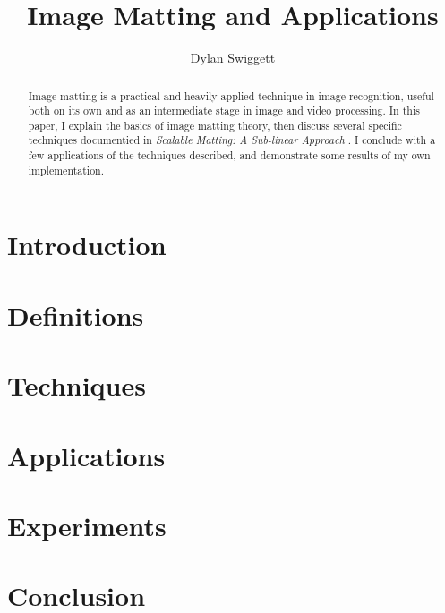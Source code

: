 \documentclass[10pt,a4paper]{article}
\author{Dylan Swiggett}
\title{Image Matting and Applications}
\date{}
\begin{document}
\maketitle

\begin{abstract}
Image matting is a practical and heavily applied technique in image recognition, useful both on its own and as an intermediate stage in image and video processing. In this paper, I explain the basics of image matting theory, then discuss several specific techniques documentied in \textit{Scalable Matting: A Sub-linear Approach} \cite{lee14}. I conclude with a few applications of the techniques described, and demonstrate some results of my own implementation.
\end{abstract}

\tableofcontents
\pagebreak

\iffalse
\pagestyle{empty}
\begin{quote}
\item
\end{quote}
\pagebreak
\setcounter{page}{2}
\pagestyle{plain}
\fi

\section{Introduction}

\section{Definitions}

\section{Techniques}

\section{Applications}

\section{Experiments}

\section{Conclusion}


\pagebreak

\end{document}
